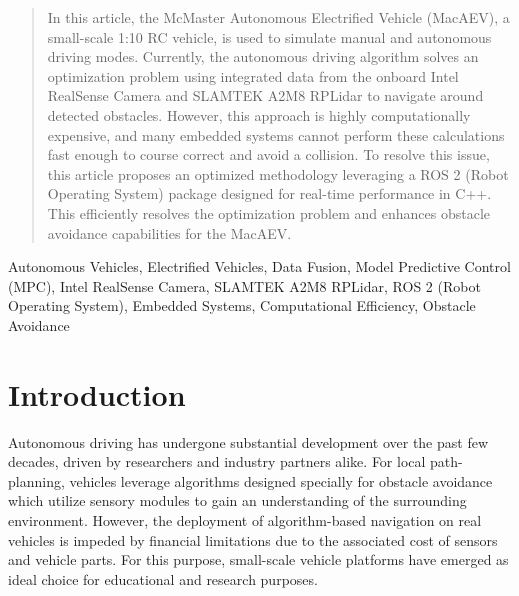 \documentclass[conference]{IEEEtran}
\begin{document}
\begin{abstract}
In this article, the McMaster Autonomous Electrified Vehicle (MacAEV), a small-scale 1:10 RC vehicle, is used to simulate manual and autonomous driving modes. Currently, the autonomous driving algorithm solves an optimization problem using integrated data from the onboard Intel RealSense Camera and SLAMTEK A2M8 RPLidar to navigate around detected obstacles. However, this approach is highly computationally expensive, and many embedded systems cannot perform these calculations fast enough to course correct and avoid a collision. To resolve this issue, this article proposes an optimized methodology leveraging a ROS 2 (Robot Operating System) package designed for real-time performance in C++. This efficiently resolves the optimization problem and enhances obstacle avoidance capabilities for the MacAEV. 




\end{abstract}

\begin{IEEEkeywords}
Autonomous Vehicles, Electrified Vehicles, Data Fusion, Model Predictive Control (MPC),
Intel RealSense Camera, SLAMTEK A2M8 RPLidar, ROS 2 (Robot Operating System), Embedded Systems,
Computational Efficiency, Obstacle Avoidance
\end{IEEEkeywords}

\section{Introduction}


Autonomous driving has undergone substantial development over the past few decades, driven by researchers and industry partners alike. For local path-planning, vehicles leverage algorithms  designed specially for obstacle avoidance which utilize sensory modules to gain an understanding of the surrounding environment. However, the deployment of algorithm-based navigation on real vehicles is impeded by financial limitations due to the associated cost of sensors and vehicle parts. For this purpose, small-scale vehicle platforms have emerged as ideal choice for educational and research purposes. 
\end{document}
